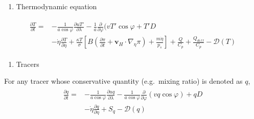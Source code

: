 \begin{enumerate}
\def\labelenumi{\arabic{enumi}.}
\setcounter{enumi}{3}
\tightlist
\item
  Thermodynamic equation
\end{enumerate}

\begin{eqnarray}
\begin{aligned}
    \frac{\partial T}{\partial t}
    = & - \frac{1}{a\cos\varphi}
      \frac{\partial uT'}{\partial \lambda}
      - \frac{1}{a}
      \frac{\partial }{\partial \varphi} ( vT' \cos\varphi + T' D \\
    & - \dot{\eta}
    \frac{\partial T }{\partial \eta}
    + \frac{\kappa T}{\sigma} \left[ B\left( \frac{\partial \pi}{\partial t}
    + {\mathbf{v}}_{H} \cdot \nabla_{\eta}\pi \right)
    + \frac{ m\dot{\eta} }{ p_s }
    \right]
    + \frac{Q}{C_{p}}
    + \frac{Q_{diff}}{C_{p}}
      - {\mathcal D}(T)
\end{aligned} \end{eqnarray}

\begin{enumerate}
\def\labelenumi{\arabic{enumi}.}
\setcounter{enumi}{4}
\tightlist
\item
  Tracers
\end{enumerate}

For any tracer whose conservative quantity (e.g.~mixing ratio) is denoted as \(q\), \begin{eqnarray}
\begin{aligned}
  \frac{\partial q}{\partial t}
    = & - \frac{1}{a\cos\varphi}
  \frac{\partial uq}{\partial \lambda} - \frac{1}{a\cos\varphi} \frac{\partial }{\partial \varphi} (vq \cos\varphi) + q D \\
  & - \dot{\eta} \frac{\partial q }{\partial \eta}
    + S_{q}
    - {\mathcal D}(q)
\end{aligned} \end{eqnarray}

